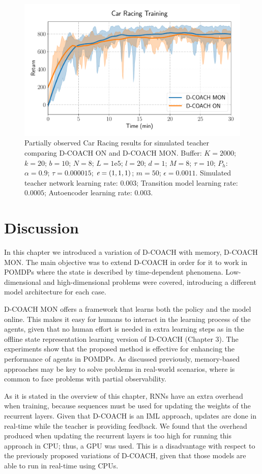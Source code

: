 \begin{figure}[H]
    \centering
    \includegraphics[width=0.7\linewidth]{imagenes/cap3/car_racing_lstm.pdf}
    \caption[Partially observed Car Racing results for simulated teacher comparing D-COACH ON and D-COACH MON.]{Partially observed Car Racing results for simulated teacher comparing D-COACH ON and D-COACH MON.  Buffer: $K = 2000$; $k=20$; $b=10$; $N = 8$; $L=1\mathrm{e}5$; $l=20$; $d=1$; $M=8$; $\tau=10$; $P_{h}$: $\alpha = 0.9$; $\tau = 0.000015$; $\emph{e}=(1, 1, 1)$; $m=50$; $\epsilon=0.0011$. Simulated teacher network learning rate: $0.003$; Transition model learning rate: $0.0005$; Autoencoder learning rate: $0.003$.}
    \label{fig:po_cr}
\end{figure}

\section{Discussion}
In this chapter we introduced a variation of D-COACH with memory, D-COACH MON. The main objective was to extend D-COACH in order for it to work in POMDPs where the state is described by time-dependent phenomena. Low-dimensional and high-dimensional problems were covered, introducing a different model architecture for each case. 

D-COACH MON offers a framework that learns both the policy and the model online. This makes it easy for humans to interact in the learning process of the agents, given that no human effort is needed in extra learning steps as in the offline state representation learning version of D-COACH (Chapter 3). The experiments show that the proposed method is effective for enhancing the performance of agents in POMDPs. As discussed previously, memory-based approaches may be key to solve problems in real-world scenarios, where is common to face problems with partial observability. 

As it is stated in the overview of this chapter, RNNs have an extra overhead when training, because sequences must be used for updating the weights of the recurrent layers. Given that D-COACH is an IML approach, updates are done in real-time while the teacher is providing feedback. We found that the overhead produced when updating the recurrent layers is too high for running this approach in CPU; thus, a GPU was used. This is a disadvantage with respect to the previously proposed variations of D-COACH, given that those models are able to run in real-time using CPUs. 